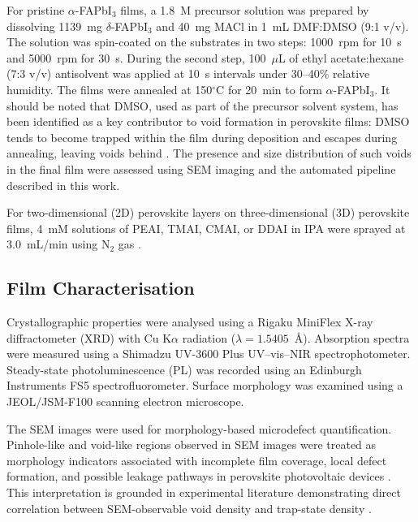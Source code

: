 \documentclass[pdflatex,sn-mathphys-num,iicol]{sn-jnl}
\theoremstyle{thmstyleone}
\theoremstyle{thmstyletwo}
\theoremstyle{thmstylethree}
\begin{document}
For pristine $\alpha$-FAPbI$_3$ films, a 1.8~M precursor solution
was prepared by dissolving 1139~mg $\delta$-FAPbI$_3$ and 40~mg
MACl in 1~mL DMF:DMSO (9:1 v/v). The solution was spin-coated on
the substrates in two steps: 1000~rpm for 10~s and 5000~rpm for 30~s.
During the second step, 100~$\mu$L of ethyl acetate:hexane (7:3 v/v)
antisolvent was applied at 10~s intervals under 30--40\% relative
humidity. The films were annealed at 150$^\circ$C for 20~min to form
$\alpha$-FAPbI$_3$. It should be noted that DMSO, used as part of
the precursor solvent system, has been identified as a key contributor
to void formation in perovskite films: DMSO tends to become trapped
within the film during deposition and escapes during annealing,
leaving voids behind \cite{chang2026,chen2021}. The presence and
size distribution of such voids in the final film were assessed using
SEM imaging and the automated pipeline described in this work.

For two-dimensional (2D) perovskite layers on three-dimensional (3D)
perovskite films, 4~mM solutions of PEAI, TMAI, CMAI, or DDAI in IPA
were sprayed at 3.0~mL/min using N$_2$ gas .

\subsection{Film Characterisation}\label{subsec:film_characterization}

Crystallographic properties were analysed using a Rigaku MiniFlex
X-ray diffractometer (XRD) with Cu K$\alpha$ radiation
($\lambda = 1.5405$~\AA). Absorption spectra were measured using a
Shimadzu UV-3600 Plus UV--vis--NIR spectrophotometer. Steady-state
photoluminescence (PL) was recorded using an Edinburgh Instruments
FS5 spectrofluorometer. Surface morphology was examined using a
JEOL/JSM-F100 scanning electron microscope.

The SEM images were used for morphology-based microdefect
quantification. Pinhole-like and void-like regions observed in SEM
images were treated as morphology indicators associated with
incomplete film coverage, local defect formation, and possible
leakage pathways in perovskite photovoltaic devices
\cite{chang2026,hu2023}. This interpretation is grounded in
experimental literature demonstrating direct correlation between
SEM-observable void density and trap-state density
\cite{chang2026}.

\end{document}
